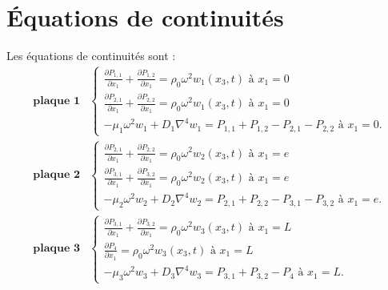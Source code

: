 \documentclass[12pt,foolscap]{report}
\begin{document}
	\section*{Équations de continuités}
	Les équations de continuités sont : 
	\begin{align}
	\textbf{ plaque 1}&\begin{cases}
	\frac{\partial P_{1,1}}{\partial x_1}+\frac{\partial P_{1,2}}{\partial x_1} = \rho_0\omega^2w_1(x_3,t)\text{ à }x_1=0\\
	\frac{\partial P_{2,1}}{\partial x_1}+\frac{\partial P_{2,2}}{\partial x_1}  = \rho_0 \omega^2 w_1(x_3,t)\text{ à }x_1=0\\
	-\mu_1 \omega^2w_1+D_1\nabla^4w_1 = P_{1,1}+P_{1,2}-P_{2,1}-P_{2,2} \text{ à }x_1=0\text{.}
	\end{cases}\\
	\textbf{ plaque 2}&\begin{cases}
	\frac{\partial P_{2,1}}{\partial x_1}+\frac{\partial P_{2,2}}{\partial x_1} = \rho_0\omega^2w_2(x_3,t)\text{ à }x_1=e\\
	\frac{\partial P_{3,1}}{\partial x_1}+\frac{\partial P_{3,2}}{\partial x_1} = \rho_0 \omega^2 w_2(x_3,t)\text{ à }x_1=e\\
	-\mu_2 \omega^2w_2+D_2\nabla^4w_2 =P_{2,1}+P_{2,2}-P_{3,1}-P_{3,2} \text{ à }x_1=e\text{.}
	\end{cases}\\
	\textbf{ plaque 3}&\begin{cases}
	\frac{\partial P_{3,1}}{\partial x_1}+\frac{\partial P_{3,2}}{\partial x_1} = \rho_0\omega^2w_3(x_3,t)\text{ à }x_1=L\\
	\frac{\partial P_{4}}{\partial x_1} = \rho_0 \omega^2 w_3(x_3,t)\text{ à }x_1=L\\
	-\mu_3 \omega^2w_3+D_3\nabla^4w_3 =P_{3,1}+P_{3,2}-P_{4} \text{ à }x_1=L\text{.}
	\end{cases}
	\end{align}
\end{document}
